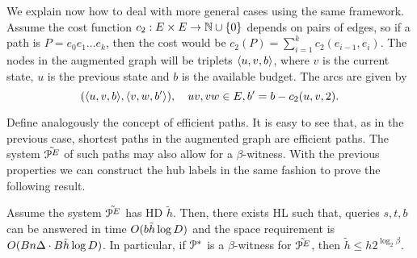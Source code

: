 We explain now how to deal with more general cases using the same framework.
Assume the cost function $c_2:E\times E\to \mathbb{N}\cup \{0\}$ depends on pairs of edges, so if a path is $P=e_0e_1\ldots e_k$, then the cost would be $c_2(P)=\sum_{i=1}^{k}c_2(e_{i-1},e_i)$.
The nodes in the augmented graph will be triplets $\langle u,v,b\rangle$, where $v$ is the current state, $u$ is the previous state and $b$ is the available budget.
The arcs are given by
\[
(\langle u,v,b\rangle,\langle v,w,b'\rangle), \quad uv,vw\in E, b'=b-c_2(u,v,2).
\]

Define analogously the concept of efficient paths.
It is easy to see that, as in the previous case, shortest paths in the augmented graph are efficient paths.
The system $\tilde{\mathcal{P}^E}$ of such paths may also allow for a $\beta$-witness.
With the previous properties we can construct the hub labels in the same fashion to prove the following result.

\begin{theorem}
Assume the system $\tilde{\mathcal{P}^E}$ has HD $\tilde h$.
Then, there exists HL such that, queries $s,t,b$ can be answered in time $O(b\tilde h\log D)$ and the space requirement is $O(Bn\Delta\cdot B\tilde h\log D)$.
In particular, if $\mathcal{P}^*$ is a $\beta$-witness for $\tilde {\mathcal{P}^E}$, then $\tilde h\leq h2^{\log_2\beta}$. 
\end{theorem}